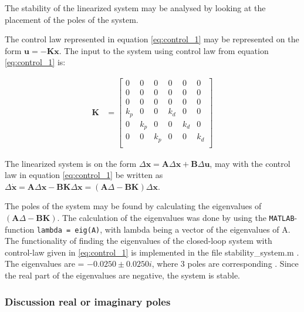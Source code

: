 The stability of the linearized system may be analysed by looking at the placement of the poles of the system.

The control law represented in equation \eqref{eq:control_1} may be represented on the form $ \mathbf{u} = - \mathbf{K} \mathbf{x}$. The input to the system using control law from equation \eqref{eq:control_1} is:

\begin{equation}
\begin{aligned}
    \mathbf{K}
    &=
    \begin{bmatrix}
    0 & 0 & 0 & 0 & 0 & 0 \\ 
    0 & 0 & 0 & 0 & 0 & 0 \\ 
    0 & 0 & 0 & 0 & 0 & 0 \\ 
    k_p & 0 & 0 & k_d & 0 & 0 \\ 
    0 & k_p & 0 & 0 & k_d & 0 \\ 
    0 & 0 & k_p & 0 & 0 & k_d \\ 
    \end{bmatrix}
    \label{eq:K}
\end{aligned}
\end{equation}

The linearized system is on the form $\Delta \mathbf{x} = \mathbf{A}\Delta \mathbf{x} + \mathbf{B} \Delta \mathbf{u}$, may with the control law in equation \eqref{eq:control_1} be written as $\Delta \dot{\mathbf{x}} = \mathbf{A}\Delta \mathbf{x} - \mathbf{B K} \Delta \mathbf{x} = ( \mathbf{A}\Delta  - \mathbf{B K} ) \Delta \mathbf{x} $.

The poles of the system may be found by calculating the eigenvalues of $( \mathbf{A}\Delta  - \mathbf{B K} )$. The calculation of the eigenvalues was done by using the \texttt{MATLAB}-function \texttt{lambda = eig(A)}, with lambda being a vector of the eigenvalues of A. The functionality of finding the eigenvalues of the closed-loop system with control-law given in \eqref{eq:control_1} is implemented in the file
{\color{blue}  stability\_system.m }. The eigenvalues are = $- 0.0250 \pm 0.0250i$, where 3 poles are corresponding . Since the real part of the eigenvalues are negative, the system is stable.

\subsubsection*{Discussion real or imaginary poles}

